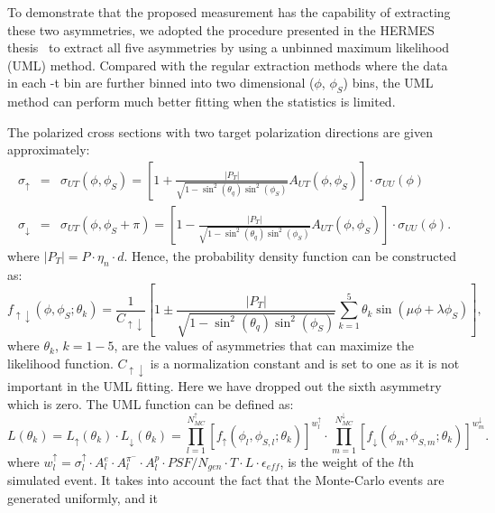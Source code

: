 To demonstrate that the proposed measurement has the capability of extracting
these two asymmetries, we adopted the procedure presented in the HERMES
thesis~\cite{hermes-thesis} to extract all five asymmetries by using a unbinned
maximum likelihood (UML) method. Compared with the regular extraction methods
where the data in each -t bin are further binned into two dimensional ($\phi$,
$\phi_S$) bins, the UML method can perform much better fitting when the
statistics is limited.

The polarized cross sections with two target polarization directions are given
approximately:
\begin{eqnarray}
     \sigma_{\uparrow} &=& \sigma_{UT}(\phi, \phi_{S}) = [1 +
       \frac{|P_{T}|}{\sqrt{1-\sin^2(\theta_{q})\sin^2(\phi_{S})}} A_{UT}(\phi,
       \phi_{S})] \cdot \sigma_{UU}(\phi) \\
     \sigma_{\downarrow} &=& \sigma_{UT}(\phi, \phi_{S}+\pi) = [1
       -\frac{|P_{T}|}{\sqrt{1-\sin^2(\theta_{q})\sin^2(\phi_{S})}} A_{UT}(\phi,
       \phi_{S})]\cdot \sigma_{UU}(\phi).
\end{eqnarray}
where $|P_{T}| = P\cdot \eta_{n} \cdot d $. Hence, the probability density
function can be constructed as:
\begin{equation}
  f_{\uparrow\downarrow}(\phi, \phi_{S}; \theta_{k}) =
  \frac{1}{C_{\uparrow\downarrow}} [1 \pm
    \frac{|P_{T}|}{\sqrt{1-\sin^2(\theta_{q})\sin^2(\phi_{S})}} \sum_{k=1}^{5}
    \theta_{k} \sin(\mu\phi+\lambda\phi_{S})],
\end{equation}
where $\theta_{k}$, $k=1-5$, are the values of asymmetries that can maximize
the likelihood function.  $C_{\uparrow\downarrow}$ is a normalization constant
and is set to one as it is not important in the UML fitting. Here we have
dropped out the sixth asymmetry which is zero. The UML function can be defined
as:
\begin{equation}
	L(\theta_{k}) = L_{\uparrow}(\theta_{k})\cdot
        L_{\downarrow}(\theta_{k})=\prod_{l=1}^{N_{MC}^{\uparrow}}[f_{\uparrow}(\phi_{l},
          \phi_{S,l};\theta_{k})]^{w^{\uparrow}_{l}}\cdot
        \prod_{m=1}^{N_{MC}^{\downarrow}}[f_{\downarrow}(\phi_{m},
          \phi_{S,m};\theta_{k})]^{w^{\downarrow}_{m}}.
\end{equation}
where $w^{\uparrow}_{l} = \sigma^{\uparrow}_{l}\cdot A^{e}_{l} \cdot
A^{\pi^{-}}_{l} \cdot A^{p}_{l} \cdot PSF/N_{gen} \cdot T \cdot L \cdot
\epsilon_{eff}$, is the weight of the $l$th simulated event. It takes into
account the fact that the Monte-Carlo events are generated uniformly, and it
